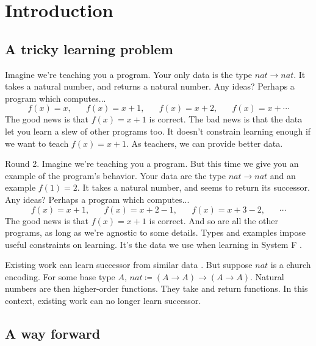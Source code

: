 \documentclass[acmsmall]{acmart}
\theoremstyle{mytheoremstyle}
\begin{document}
\maketitle


\section{Introduction}
\subsection{A tricky learning problem}

Imagine we're teaching you a program. Your only data is the type $nat \!\to\! nat$. It takes a natural number, and returns a natural number. Any ideas? Perhaps a program which computes...
$$f(x) = x, \;\;\;\;\;\;f(x) = x + 1,\;\;\;\;\;\; f(x) = x + 2,\;\;\;\;\;\; f(x) = x + \cdots$$
The good news is that $f(x) = x + 1$ is correct. The bad news is that the data let you learn a slew of other programs too. It doesn't constrain learning enough if we want to teach $f(x) = x + 1$. As teachers, we can provide better data.

Round 2. Imagine we're teaching you a program. But this time we give you an example of the program's behavior. Your data are the type $nat \!\to\! nat$ and an example $f(1) = 2$. It takes a natural number, and seems to return its successor. Any ideas? Perhaps a program which computes...
$$f(x) = x + 1,\;\;\;\;\;\; f(x) = x + 2 - 1,\;\;\;\;\;\; f(x) = x + 3 - 2,\;\;\;\;\;\;\cdots$$
The good news is that $f(x) = x + 1$ is correct. And so are all the other programs, as long as we're agnostic to some details. Types and examples impose useful constraints on learning. It's the data we use when learning in System F \cite{girard1989proofs}.

Existing work can learn successor from similar data \cite{osera2015program, polikarpova2016program}. But suppose $nat$ is a church encoding. For some base type $A$, $nat \coloneqq (A \to A) \to (A \to A)$. Natural numbers are then higher-order functions. They take and return functions. In this context, existing work can no longer learn successor. 

\subsection{A way forward}
\end{document}
